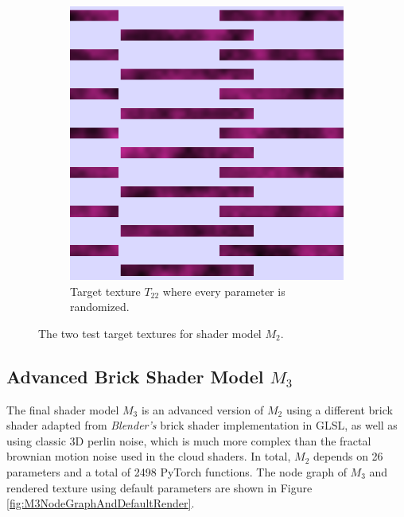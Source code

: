 \begin{figure}[!h]
\begin{subfigure}[t]{.25\textwidth}
    \includegraphics[width=\linewidth]{img/evaluation/simple_brick_random_target.png}
    \caption{Target texture $T_ {22}$ where every parameter is randomized.}
    \label{fig:TargetM2Random}
\end{subfigure}
\caption{The two test target textures for shader model $M_2$.}
\label{fig:TargetsM2}
\end{figure}


\subsection{Advanced Brick Shader Model $M_3$}
The final shader model $M_3$ is an advanced version of $M_2$ using a different brick shader adapted from \textit{Blender's} brick shader implementation in GLSL, as well as using classic 3D perlin noise, which is much more complex than the fractal brownian motion noise used in the cloud shaders. In total, $M_2$ depends on 26 parameters and a total of 2498 PyTorch functions. The node graph of $M_3$ and rendered texture using default parameters are shown in Figure \ref{fig:M3NodeGraphAndDefaultRender}.

